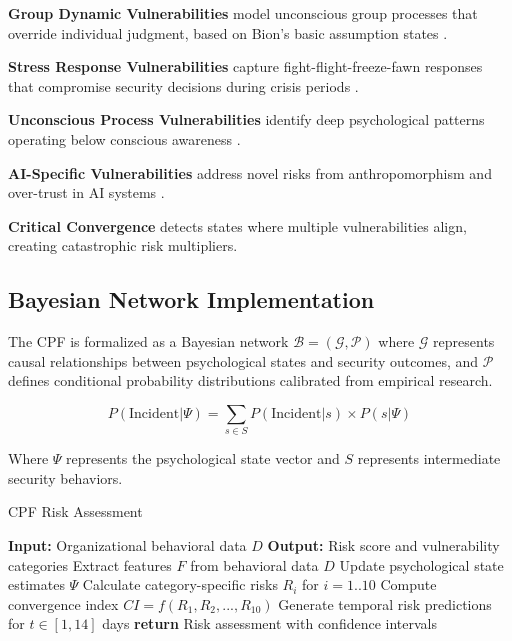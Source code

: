 \documentclass[10pt,twocolumn]{IEEEtran}
\begin{document}
\textbf{Group Dynamic Vulnerabilities} model unconscious group processes that override individual judgment, based on Bion's basic assumption states \cite{bion1961}.

\textbf{Stress Response Vulnerabilities} capture fight-flight-freeze-fawn responses that compromise security decisions during crisis periods \cite{selye1956}.

\textbf{Unconscious Process Vulnerabilities} identify deep psychological patterns operating below conscious awareness \cite{jung1969}.

\textbf{AI-Specific Vulnerabilities} address novel risks from anthropomorphism and over-trust in AI systems \cite{brundage2024}.

\textbf{Critical Convergence} detects states where multiple vulnerabilities align, creating catastrophic risk multipliers.

\subsection{Bayesian Network Implementation}

The CPF is formalized as a Bayesian network $\mathcal{B} = (\mathcal{G}, \mathcal{P})$ where $\mathcal{G}$ represents causal relationships between psychological states and security outcomes, and $\mathcal{P}$ defines conditional probability distributions calibrated from empirical research.

\begin{equation}
P(\text{Incident} | \Psi) = \sum_{s \in S} P(\text{Incident} | s) \times P(s | \Psi)
\end{equation}

Where $\Psi$ represents the psychological state vector and $S$ represents intermediate security behaviors.

\begin{algorithm}
\caption{CPF Risk Assessment}
\label{alg:risk}
\begin{algorithmic}[1]
\STATE \textbf{Input:} Organizational behavioral data $D$
\STATE \textbf{Output:} Risk score and vulnerability categories
\STATE Extract features $F$ from behavioral data $D$
\STATE Update psychological state estimates $\Psi$
\STATE Calculate category-specific risks $R_i$ for $i = 1..10$
\STATE Compute convergence index $CI = f(R_1, R_2, ..., R_{10})$
\STATE Generate temporal risk predictions for $t \in [1,14]$ days
\STATE \textbf{return} Risk assessment with confidence intervals
\end{algorithmic}
\end{algorithm}
\end{document}
